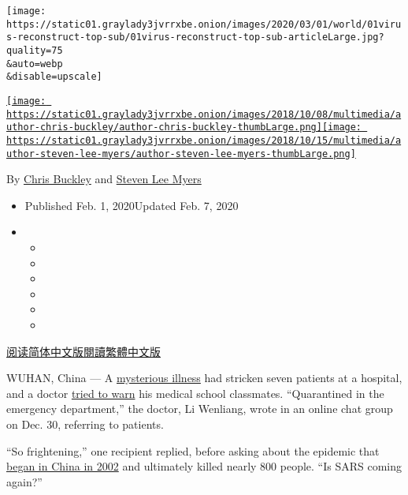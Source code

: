 \texttt{[image: https://static01.graylady3jvrrxbe.onion/images/2020/03/01/world/01virus-reconstruct-top-sub/01virus-reconstruct-top-sub-articleLarge.jpg?quality=75\\\&auto=webp\\\&disable=upscale]}

\href{https://www.nytimes3xbfgragh.onion/by/chris-buckley}{\texttt{[image: https://static01.graylady3jvrrxbe.onion/images/2018/10/08/multimedia/author-chris-buckley/author-chris-buckley-thumbLarge.png]}}\href{https://www.nytimes3xbfgragh.onion/by/steven-lee-myers}{\texttt{[image: https://static01.graylady3jvrrxbe.onion/images/2018/10/15/multimedia/author-steven-lee-myers/author-steven-lee-myers-thumbLarge.png]}}

By \href{https://www.nytimes3xbfgragh.onion/by/chris-buckley}{Chris
Buckley} and
\href{https://www.nytimes3xbfgragh.onion/by/steven-lee-myers}{Steven Lee
Myers}

\begin{itemize}
\item
  Published Feb. 1, 2020Updated Feb. 7, 2020
\item
  \begin{itemize}
  \item
  \item
  \item
  \item
  \item
  \item
  \end{itemize}
\end{itemize}

\href{https://cn.nytimes3xbfgragh.onion/china/20200203/china-coronavirus/}{阅读简体中文版}\href{https://cn.nytimes3xbfgragh.onion/china/20200203/china-coronavirus/zh-hant/}{閱讀繁體中文版}

WUHAN, China --- A
\href{https://www.nytimes3xbfgragh.onion/2020/02/01/world/asia/coronavirus-china.html}{mysterious
illness} had stricken seven patients at a hospital, and a doctor
\href{https://www.nytimes3xbfgragh.onion/2020/01/27/world/asia/27china-coronavirus-health.html}{tried
to warn} his medical school classmates. ``Quarantined in the emergency
department,'' the doctor, Li Wenliang, wrote in an online chat group on
Dec. 30, referring to patients.

``So frightening,'' one recipient replied, before asking about the
epidemic that
\href{https://www.nytimes3xbfgragh.onion/2003/04/27/world/the-sars-epidemic-the-path-from-china-s-provinces-a-crafty-germ-breaks-out.html}{began
in China in 2002} and ultimately killed nearly 800 people. ``Is SARS
coming again?''

